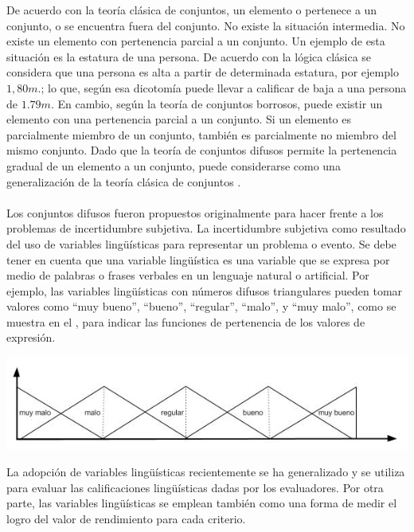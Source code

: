 De acuerdo con la teoría clásica de conjuntos, un elemento o pertenece a un conjunto, o se encuentra fuera del conjunto. No existe la situación intermedia. No existe un elemento con pertenencia parcial a un conjunto. Un ejemplo de esta situación es la estatura de una persona. De acuerdo con la lógica clásica se considera que una persona es alta a partir de determinada estatura, por ejemplo $1,80 m.$; lo que, según esa dicotomía puede llevar a calificar de baja a una persona de $1.79 m.$ En cambio, según la teoría de conjuntos borrosos, puede existir un elemento con una pertenencia parcial a un conjunto. Si un elemento es parcialmente miembro de un conjunto, también es parcialmente no miembro del mismo conjunto. Dado que la teoría de conjuntos difusos permite la pertenencia gradual de un elemento a un conjunto, puede considerarse como una generalización de la teoría clásica de conjuntos \cite[]{negnevitsky2005artificial, zadeh2008there}.\\
\\
Los conjuntos difusos fueron propuestos originalmente para hacer frente a los problemas de incertidumbre subjetiva. La incertidumbre subjetiva como resultado del uso de variables lingüísticas para representar un problema o  evento. Se debe tener en cuenta que una variable lingüística es una variable que se expresa por medio de palabras o frases verbales en un lenguaje natural o artificial. Por ejemplo, las variables lingüísticas con números difusos triangulares pueden tomar valores como ``muy bueno'', ``bueno'', ``regular'', ``malo'', y ``muy malo'', como se muestra en el , para indicar las funciones de pertenencia de los valores de expresión.
\begin{grafico}[titulo = Función de pertenencia de algunas variables lingüísticas, etiqueta=graficoVariables]
\includegraphics[width=15cm]{graficas/variables.jpg}
\end{grafico}
La adopción de variables lingüísticas recientemente se ha generalizado y se utiliza para evaluar las calificaciones lingüísticas dadas por los evaluadores. Por otra parte, las variables lingüísticas se emplean también como una forma de medir el logro del valor de rendimiento para cada criterio.\\

